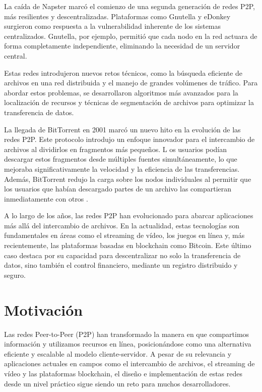 La caída de Napster marcó el comienzo de una segunda generación de redes P2P, más resilientes y descentralizadas.
Plataformas como Gnutella y eDonkey surgieron como respuesta a la vulnerabilidad inherente de los sistemas centralizados.
Gnutella, por ejemplo, permitió que cada nodo en la red actuara de forma completamente independiente, eliminando la necesidad de un servidor central.


Estas redes introdujeron nuevos retos técnicos, como la búsqueda eficiente de archivos en una red distribuida y el manejo de grandes volúmenes de tráfico.
Para abordar estos problemas, se desarrollaron algoritmos más avanzados para la localización de recursos y técnicas de segmentación de archivos para optimizar la transferencia de datos.


La llegada de BitTorrent en 2001 marcó un nuevo hito en la evolución de las redes P2P.
Este protocolo introdujo un enfoque innovador para el intercambio de archivos al dividirlos en fragmentos más pequeños. L
os usuarios podían descargar estos fragmentos desde múltiples fuentes simultáneamente, lo que mejoraba significativamente la velocidad y la eficiencia de las transferencias.
Además, BitTorrent redujo la carga sobre los nodos individuales al permitir que los usuarios que habían descargado partes de un archivo las compartieran inmediatamente con otros \cite{cohen2003}.


A lo largo de los años, las redes P2P han evolucionado para abarcar aplicaciones más allá del intercambio de archivos.
En la actualidad, estas tecnologías son fundamentales en áreas como el streaming de vídeo, los juegos en línea y, más recientemente, las plataformas basadas en blockchain como Bitcoin.
Este último caso destaca por su capacidad para descentralizar no solo la transferencia de datos, sino también el control financiero, mediante un registro distribuido y seguro.



\section{Motivación}

Las redes Peer-to-Peer (P2P) han transformado la manera en que compartimos información y utilizamos recursos en línea,
posicionándose como una alternativa eficiente y escalable al modelo cliente-servidor.
A pesar de su relevancia y aplicaciones actuales en campos como el intercambio de archivos, el streaming de vídeo y las plataformas blockchain,
el diseño e implementación de estas redes desde un nivel práctico sigue siendo un reto para muchos desarrolladores.

